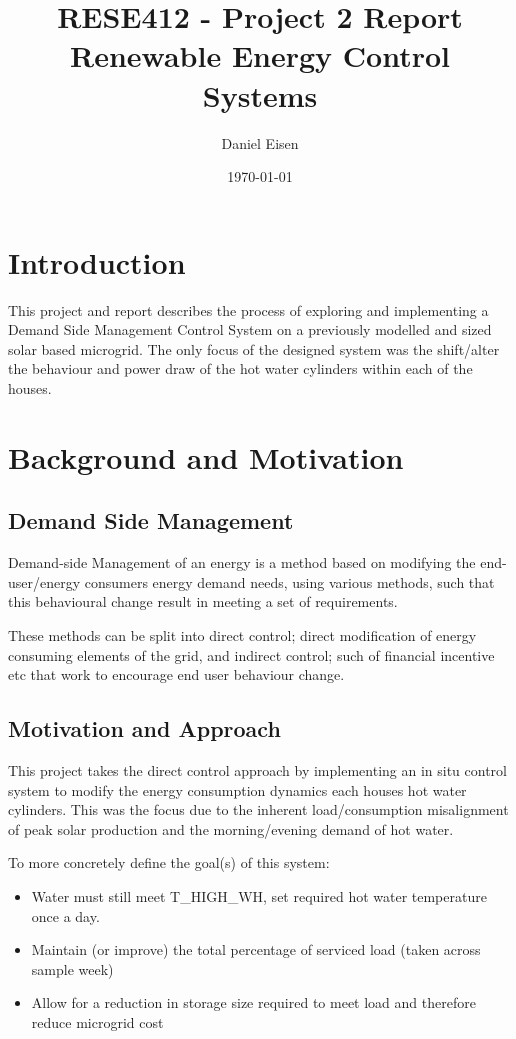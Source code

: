 \documentclass[11pt]{article}
\title{RESE412 - Project 2 Report \\ Renewable Energy Control Systems}
\author{Daniel Eisen}
\date{\today}
\begin{document}
\maketitle
\section{Introduction}
This project and report describes the process of exploring and implementing a Demand Side Management Control System on a previously modelled and sized solar based microgrid. The only focus of the designed system was the shift/alter the behaviour and power draw of the hot water cylinders within each of the houses.

\section{Background and Motivation}
    \subsection*{Demand Side Management}
    Demand-side Management of an energy is a method based on modifying the end-user/energy consumers energy demand needs, using various methods, such that this behavioural change result in meeting a set of requirements. 

    These methods can be split into direct control; direct modification of energy consuming elements of the grid, and indirect control; such of financial incentive etc that work to encourage end user behaviour change.

    \subsection*{Motivation and Approach}
    This project takes the direct control approach by implementing an in situ control system to modify the energy consumption dynamics each houses hot water cylinders. This was the focus due to the inherent load/consumption misalignment of peak solar production and the morning/evening demand of hot water. 
    
    To more concretely define the goal(s) of this system:
    \begin{itemize}
        \item Water must still meet T\_HIGH\_WH, set required hot water temperature once a day.
        \item Maintain (or improve) the total percentage of serviced load (taken across sample week)
        \item Allow for a reduction in storage size required to meet load and therefore reduce microgrid cost 
    \end{itemize}
\end{document}

